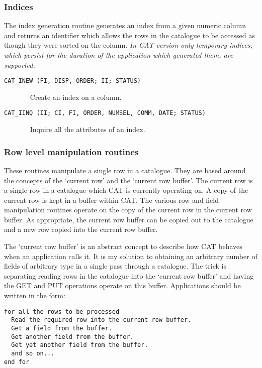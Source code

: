 \subsubsection{Indices}

The index generation routine generates an index from a given numeric
column and returns an identifier which allows the rows in the catalogue
to be accessed as though they were sorted on the column.   {\it In CAT
version \CATversion only temporary indices, which persist for the
duration of the application which generated them, are supported.}

\begin{description}

  \item[ {\tt CAT\_INEW (FI, DISP, ORDER; II; STATUS) } ] ~
  \newline Create an index on a column.

  \item[ {\tt CAT\_IINQ (II; CI, FI, ORDER, NUMSEL, COMM, DATE; STATUS) } ] ~
  \newline Inquire all the attributes of an index.

\end{description}

\subsubsection{Row level manipulation routines}

These routines manipulate a single row in a catalogue. They are based
around the concepts of the `current row' and the `current row buffer'.
The current row is a single row in a catalogue which CAT is 
currently operating on. A copy of the current row is kept in a buffer 
within CAT. The various row and field manipulation routines operate
on the copy of the current row in the current row buffer. As
appropriate, the current row buffer can be copied out to the catalogue
and a new row copied into the current row buffer.

The `current row buffer' is an abstract concept to describe how CAT
behaves when an application calls it. It is my solution to obtaining 
an arbitrary number of fields of arbitrary type in a single 
pass through a catalogue. The trick is separating reading rows in the 
catalogue into the `current row buffer' and having the GET and PUT 
operations operate on this buffer. Applications should be written in the 
form:

\begin{verbatim}
for all the rows to be processed
  Read the required row into the current row buffer.
  Get a field from the buffer.
  Get another field from the buffer.
  Get yet another field from the buffer.
  and so on...
end for
\end{verbatim}

